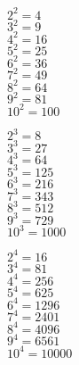 \documentclass[12pt]{article}
\begin{document}
\begin{multicols}{3}

$2^2=4$\\

$3^2=9$\\

$4^2=16$\\

$5^2=25$\\

$6^2=36$\\

$7^2=49$\\

$8^2=64$\\

$9^2=81$\\

$10^2=100$\\

\vfill

$2^3=8$\\

$3^3=27$\\

$4^3=64$\\

$5^3=125$\\

$6^3=216$\\

$7^3=343$\\

$8^3=512$\\

$9^3=729$\\

$10^3=1000$\\

\vfill

$2^4=16$\\

$3^4=81$\\

$4^4=256$\\

$5^4=625$\\

$6^4=1296$\\

$7^4=2401$\\

$8^4=4096$\\

$9^4=6561$\\

$10^4=10000$\\

\vfill

\end{multicols}
\end{document}
